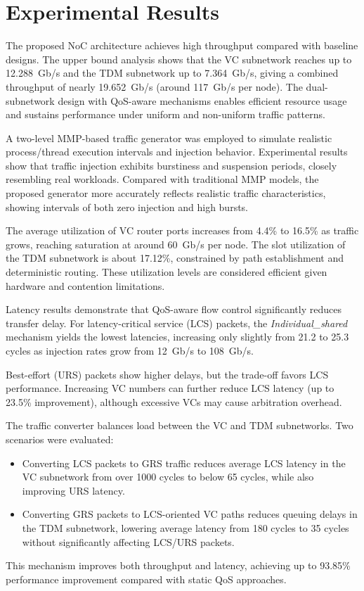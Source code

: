 \section{Experimental Results}

The proposed NoC architecture achieves high throughput compared with baseline designs. The upper bound analysis shows that the VC subnetwork reaches up to 12{.}288~Gb/s and the TDM subnetwork up to 7{.}364~Gb/s, giving a combined throughput of nearly 19{.}652~Gb/s (around 117~Gb/s per node). 
The dual-subnetwork design with QoS-aware mechanisms enables efficient resource usage and sustains performance under uniform and non-uniform traffic patterns.

A two-level MMP-based traffic generator was employed to simulate realistic process/thread execution intervals and injection behavior. Experimental results show that traffic injection exhibits burstiness and suspension periods, closely resembling real workloads. Compared with traditional MMP models, the proposed generator more accurately reflects realistic traffic characteristics, showing intervals of both zero injection and high bursts.

The average utilization of VC router ports increases from 4.4\% to 16.5\% as traffic grows, reaching saturation at around 60~Gb/s per node. The slot utilization of the TDM subnetwork is about 17.12\%, constrained by path establishment and deterministic routing. These utilization levels are considered efficient given hardware and contention limitations.

Latency results demonstrate that QoS-aware flow control significantly reduces transfer delay. For latency-critical service (LCS) packets, the \textit{Individual\_shared} mechanism yields the lowest latencies, increasing only slightly from 21.2 to 25.3 cycles as injection rates grow from 12~Gb/s to 108~Gb/s.

Best-effort (URS) packets show higher delays, but the trade-off favors LCS performance. Increasing VC numbers can further reduce LCS latency (up to 23.5\% improvement), although excessive VCs may cause arbitration overhead.

The traffic converter balances load between the VC and TDM subnetworks. 
Two scenarios were evaluated:

\begin{itemize}
    \item Converting LCS packets to GRS traffic reduces average LCS latency in the VC 
    subnetwork from over 1000 cycles to below 65 cycles, while also improving URS latency.
    \item Converting GRS packets to LCS-oriented VC paths reduces queuing delays in the 
    TDM subnetwork, lowering average latency from 180 cycles to 35 cycles without 
    significantly affecting LCS/URS packets.
\end{itemize}

This mechanism improves both throughput and latency, achieving up to 93.85\% performance improvement compared with static QoS approaches.



